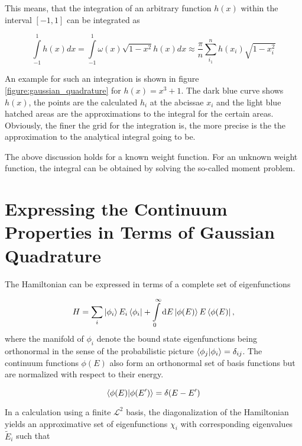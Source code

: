 This means, that the integration of an arbitrary function $h(x)$ within
the interval $[-1,1]$ can be integrated as

\begin{equation}
  \int\limits_{-1}^1 h(x) dx = \int\limits_{-1}^1 \omega(x) \sqrt{1-x^2} h(x) dx
  \approx \frac \pi n \sum\limits_{i_1}^n h(x_i) \sqrt{1-x_i^2}
\end{equation}

An example for such an integration is shown in figure \ref{figure:gaussian_quadrature}
for $h(x) = x^3 + 1$. The dark blue curve shows $h(x)$, the points are the
calculated $h_i$ at the abcissae $x_i$ and the light blue hatched areas are the
approximations to the integral for the certain areas. Obviously, the finer the
grid for the integration is, the more precise is the the approximation to
the analytical integral going to be.

The above discussion holds for a known weight function.
For an unknown weight function, the integral can be obtained by solving the so-called
moment problem. \cite{Reinhardt79}




\section{Expressing the Continuum Properties in Terms of Gaussian Quadrature}
The Hamiltonian can be expressed in terms of a complete set of eigenfunctions

\begin{equation} \label{equation:complete_hamniltonian}
  H = \sum\limits_i \ket{\phi_i} E_i \bra{\phi_i}
     + \int\limits_0^\infty \mathrm{d}E \ket{\phi(E)} E \bra{\phi(E)}  ,
\end{equation}
where the manifold of $\phi_i$ denote the bound state eigenfunctions being orthonormal
in the sense of the probabilistic picture $\braket{\phi_j|\phi_i} = \delta_{ij}$.
The continuum functions $\phi(E)$ also form an orthonormal set of basis functions
but are normalized with respect to their energy.

\begin{equation}
  \braket{\phi(E) | \phi(E')} = \delta(E-E')
\end{equation}

In a calculation using a finite $\mathcal{L}^2$ basis, the diagonalization of the
Hamiltonian yields an approximative set of eigenfunctions $\chi_i$ with corresponding
eigenvalues $\tilde{E}_i$ such that

